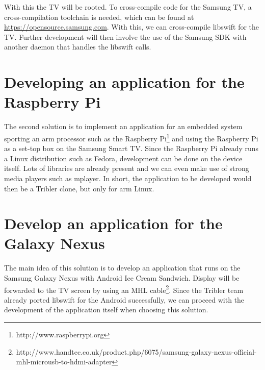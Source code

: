 With this the TV will be rooted. To cross-compile code for the Samsung TV, 
a cross-compilation toolchain is needed, which can be found at \url{https://opensource.samsung.com}.
With this, we can cross-compile libswift for the TV. Further development will then involve the use of the Samsung SDK with another daemon that handles the libswift calls.

\section*{Developing an application for the Raspberry Pi}
The second solution is to implement an application for an embedded system sporting an arm processor such as the Raspberry Pi\footnote{http://www.raspberrypi.org}
and using the Raspberry Pi as a set-top box on the Samsung Smart TV.
Since the Raspberry Pi already runs a Linux distribution such as Fedora, development can be done on the device itself.
Lots of libraries are already present and we can even make use of strong media players such as mplayer.
In short, the application to be developed would then be a Tribler clone, but only for arm Linux.

\section*{Develop an application for the Galaxy Nexus}
The main idea of this solution is to develop an application that runs on the Samsung Galaxy Nexus with Android Ice Cream Sandwich.
Display will be forwarded to the TV screen by using an MHL cable\footnote{http://www.handtec.co.uk/product.php/6075/samsung-galaxy-nexus-official-mhl-microusb-to-hdmi-adapter}.
Since the Tribler team already ported libswift for the Android successfully,
we can proceed with the development of the application itself when choosing this solution.
